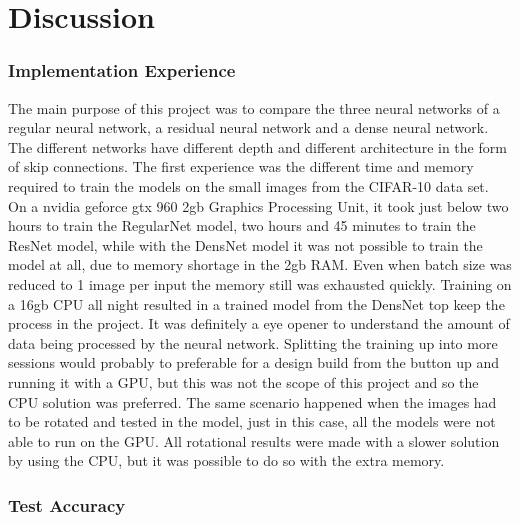 \chapter{Discussion}
\label{chp:discussion}

\subsection{Implementation Experience}

The main purpose of this project was to compare the three neural networks of a regular neural network, a residual neural network and a dense neural network. The different networks have different depth and different architecture in the form of skip connections. The first experience was the different time and memory required to train the models on the small images from the CIFAR-10 data set. On a nvidia geforce gtx 960 2gb Graphics Processing Unit, it took just below two hours to train the RegularNet model, two hours and 45 minutes to train the ResNet model, while with the DensNet model it was not possible to train the model at all, due to memory shortage in the 2gb RAM. Even when batch size was reduced to 1 image per input the memory still was exhausted quickly. Training on a 16gb CPU all night resulted in a trained model from the DensNet top keep the process in the project. It was definitely a eye opener to understand the amount of data being processed by the neural network.
Splitting the training up into more sessions would probably to preferable for a design build from the button up and running it with a GPU, but this was not the scope of this project and so the CPU solution was preferred. The same scenario happened when the images had to be rotated and tested in the model, just in this case, all the models were not able to run on the GPU. All rotational results were made with a slower solution by using the CPU, but it was possible to do so with the extra memory.

\subsection{Test Accuracy}

\FloatBarrier

